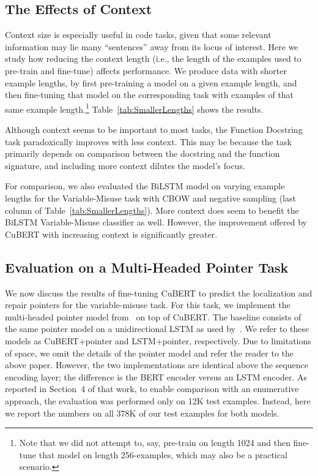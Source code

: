 \documentclass{article}
\newcommand{\BERTforCode}{CuBERT\xspace}
\newcommand{\update}[1]{#1}
\begin{document}
\subsection{The Effects of Context}
\label{sec:SmallerLengths}

Context size is especially useful in code tasks, given that some relevant information may lie many ``sentences'' away from its locus of interest. Here we study how reducing the context length (i.e., the length of the examples used to pre-train and fine-tune) affects performance. We produce data with shorter example lengths, by first pre-training a model on a given example length, and then fine-tuning that model on the corresponding task with examples of that same example length.\footnote{Note that we did not attempt to, say, pre-train on length \num{1024} and then fine-tune that model on length \num{256}-examples, which may also be a practical scenario.} Table~\ref{tab:SmallerLengths} shows the results.

\update{Although context seems to be important to most tasks, the Function Docstring task paradoxically improves with less context. This may be because the task primarily depends on comparison between the docstring and the function signature, and including more context dilutes the model's focus.}



\update{For comparison, we also evaluated the BiLSTM model on varying example lengths for the Variable-Misuse task with CBOW and negative sampling (last column of Table~\ref{tab:SmallerLengths}). More context does seem to benefit the BiLSTM Variable-Misuse classifier as well. However, the improvement offered by \BERTforCode with increasing context is significantly greater.
}

\subsection{{Evaluation on a Multi-Headed Pointer Task}}
\label{sec:varmisuse-pointer}

We now discuss the results of fine-tuning \BERTforCode to predict the localization and repair pointers for the variable-misuse task.
For this task, we implement the multi-headed pointer model from~\citet{DBLP:journals/corr/abs-1904-01720} on top of \BERTforCode.
The baseline consists of the same pointer model on a unidirectional LSTM as used by~\citet{DBLP:journals/corr/abs-1904-01720}.
We refer to these models as \BERTforCode{}+pointer and LSTM+pointer, respectively.
Due to limitations of space, we omit the details of the pointer model and refer the reader to the above paper.
However, the two implementations are identical above the sequence encoding layer;
the difference is the BERT encoder versus an LSTM encoder.
As reported in Section~4 of that work, to enable comparison with an enumerative approach, the evaluation was performed only on 12K test examples.
Instead, here we report the numbers on all \update{378K} of our test examples for both models.
\end{document}
